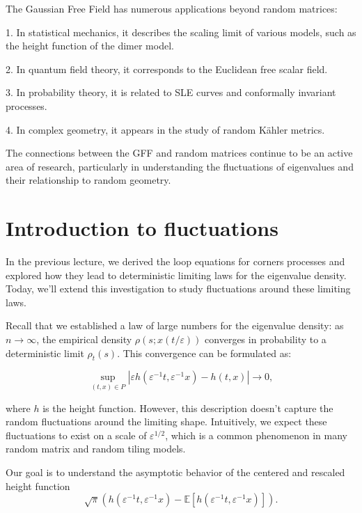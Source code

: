 \documentclass[letterpaper,11pt,oneside,reqno]{article}
\numberwithin{equation}{section}
\theoremstyle{definition}
\begin{document}
The Gaussian Free Field has numerous applications beyond random matrices:

1. In statistical mechanics, it describes the scaling limit of various models, such as the height function of the dimer model.

2. In quantum field theory, it corresponds to the Euclidean free scalar field.

3. In probability theory, it is related to SLE curves and conformally invariant processes.

4. In complex geometry, it appears in the study of random Kähler metrics.

The connections between the GFF and random matrices continue to be an active area of research, particularly in understanding the fluctuations of eigenvalues and their relationship to random geometry.
















\section{Introduction to fluctuations}

In the previous lecture, we derived the loop equations for corners processes and explored how they lead to deterministic limiting laws for the eigenvalue density. Today, we'll extend this investigation to study fluctuations around these limiting laws.

Recall that we established a law of large numbers for the eigenvalue density: as $n \to \infty$, the empirical density $\rho(s; x(t/\varepsilon))$ converges in probability to a deterministic limit $\rho_t(s)$. This convergence can be formulated as:

$$\sup_{(t,x) \in P} |\varepsilon h(\varepsilon^{-1}t, \varepsilon^{-1}x) - h(t,x)| \to 0,$$

where $h$ is the height function. However, this description doesn't capture the random fluctuations around the limiting shape. Intuitively, we expect these fluctuations to exist on a scale of $\varepsilon^{1/2}$, which is a common phenomenon in many random matrix and random tiling models.

Our goal is to understand the asymptotic behavior of the centered and rescaled height function
$$\sqrt{\pi}(h(\varepsilon^{-1}t, \varepsilon^{-1}x) - \mathbb{E}[h(\varepsilon^{-1}t, \varepsilon^{-1}x)]).$$
\end{document}
